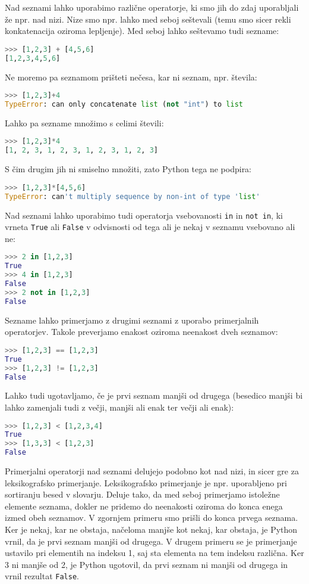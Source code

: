 Nad seznami lahko uporabimo različne operatorje, ki smo jih do zdaj uporabljali že npr. nad nizi. Nize smo npr. lahko med seboj seštevali (temu smo sicer rekli konkatenacija oziroma lepljenje). Med seboj lahko seštevamo tudi sezname:
\begin{lstlisting}[language=Python]
>>> [1,2,3] + [4,5,6]
[1,2,3,4,5,6]
\end{lstlisting}
Ne moremo pa seznamom prišteti nečesa, kar ni seznam, npr. števila:
\begin{lstlisting}[language=Python]
>>> [1,2,3]+4
TypeError: can only concatenate list (not "int") to list
\end{lstlisting}
Lahko pa sezname množimo s celimi števili:
\begin{lstlisting}[language=Python]
>>> [1,2,3]*4
[1, 2, 3, 1, 2, 3, 1, 2, 3, 1, 2, 3]
\end{lstlisting}
S čim drugim jih ni smiselno množiti, zato Python tega ne podpira:
\begin{lstlisting}[language=Python]
>>> [1,2,3]*[4,5,6]
TypeError: can't multiply sequence by non-int of type 'list'
\end{lstlisting}

Nad seznami lahko uporabimo tudi operatorja vsebovanosti \texttt{in} in \texttt{not in}, ki vrneta \texttt{True} ali \texttt{False} v odvisnosti od tega ali je nekaj v seznamu vsebovano ali ne:
\begin{lstlisting}[language=Python]
>>> 2 in [1,2,3]
True
>>> 4 in [1,2,3]
False
>>> 2 not in [1,2,3]
False
\end{lstlisting}

Sezname lahko primerjamo z drugimi seznami z uporabo primerjalnih operatorjev. Takole preverjamo enakost oziroma neenakost dveh seznamov:
\begin{lstlisting}[language=Python]
>>> [1,2,3] == [1,2,3]
True
>>> [1,2,3] != [1,2,3]
False
\end{lstlisting}
Lahko tudi ugotavljamo, če je prvi seznam manjši od drugega (besedico manjši bi lahko zamenjali tudi z večji, manjši ali enak ter večji ali enak):
\begin{lstlisting}[language=Python]
>>> [1,2,3] < [1,2,3,4]
True
>>> [1,3,3] < [1,2,3]
False
\end{lstlisting}
Primerjalni operatorji nad seznami delujejo podobno kot nad nizi, in sicer gre za leksikografsko primerjanje. Leksikografsko primerjanje je npr. uporabljeno pri sortiranju besed v slovarju. Deluje tako, da med seboj primerjamo istoležne elemente seznama, dokler ne pridemo do neenakosti oziroma do konca enega izmed obeh seznamov. V zgornjem primeru smo prišli do konca prvega seznama. Ker je nekaj, kar ne obstaja, načeloma manjše kot nekaj, kar obstaja, je Python vrnil, da je prvi seznam manjši od drugega. V drugem primeru se je primerjanje ustavilo pri elementih na indeksu 1, saj sta elementa na tem indeksu različna. Ker 3 ni manjše od 2, je Python ugotovil, da prvi seznam ni manjši od drugega in vrnil rezultat \texttt{False}.

